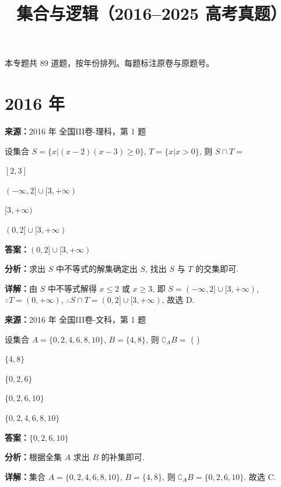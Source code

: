 ﻿\title{集合与逻辑（2016--2025 高考真题）}
\author{}
\date{}
\maketitle
\noindent 本专题共 89 道题，按年份排列。每题标注原卷与原题号。

\section*{2016 年}

\begin{question}[points=5]
\textbf{来源：}2016 年 全国III卷-理科，第 1 题\par
设集合 $S=\{x|(x-2)(x-3)\ge 0\}$, $T=\{x|x>0\}$, 则 $S\cap T=$
\begin{choices}
  \item $[2,3]$
  \item $(-\infty,2]\cup[3,+\infty)$
  \item $[3,+\infty)$
  \item $(0,2]\cup[3,+\infty)$
\end{choices}
\begin{solution}
\textbf{答案：}$(0,2]\cup[3,+\infty)$

\textbf{分析：}求出 $S$ 中不等式的解集确定出 $S$, 找出 $S$ 与 $T$ 的交集即可.

\textbf{详解：}由 $S$ 中不等式解得 $x\le 2$ 或 $x\ge 3$, 即 $S=(-\infty,2]\cup[3,+\infty)$, $\because T=(0,+\infty)$, $\therefore S\cap T=(0,2]\cup[3,+\infty)$, 故选 D.
\end{solution}
\end{question}

\begin{question}[points=5]
\textbf{来源：}2016 年 全国III卷-文科，第 1 题\par
设集合 $A=\{0, 2, 4, 6, 8, 10\}$, $B=\{4, 8\}$, 则 $\complement_AB=$ ( )
\begin{choices}
  \item $\{4, 8\}$
  \item $\{0, 2, 6\}$
  \item $\{0, 2, 6, 10\}$
  \item $\{0, 2, 4, 6, 8, 10\}$
\end{choices}
\begin{solution}
\textbf{答案：}$\{0, 2, 6, 10\}$

\textbf{分析：}根据全集 $A$ 求出 $B$ 的补集即可.

\textbf{详解：}集合 $A=\{0, 2, 4, 6, 8, 10\}$, $B=\{4, 8\}$, 则 $\complement_AB=\{0, 2, 6, 10\}$. 故选 C.
\end{solution}
\end{question}

